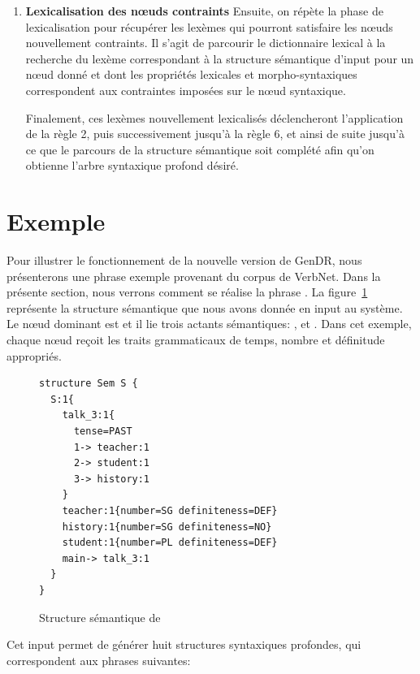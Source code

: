 \begin{enumerate}
	\item \textbf{Lexicalisation des n\oe{}uds contraints}
Ensuite, on répète la phase de lexicalisation pour récupérer les lexèmes qui pourront satisfaire les n\oe{}uds nouvellement contraints. Il s'agit de parcourir le dictionnaire lexical à la recherche du lexème correspondant à la structure sémantique d'input pour un n\oe{}ud donné et dont les propriétés lexicales et morpho-syntaxiques correspondent aux contraintes imposées sur le n\oe{}ud syntaxique.

Finalement, ces lexèmes nouvellement lexicalisés déclencheront l'application de la règle 2, puis successivement jusqu'à la règle 6, et ainsi de suite jusqu'à ce que le parcours de la structure sémantique soit complété afin qu'on obtienne l'arbre syntaxique profond désiré.

\end{enumerate} 

\section{Exemple}

Pour illustrer le fonctionnement de la nouvelle version de GenDR, nous présenterons une phrase exemple provenant du corpus de VerbNet. Dans la présente section, nous verrons comment se réalise la phrase . La figure~\ref{fig:history} représente la structure sémantique que nous avons donnée en input au système. Le n\oe{}ud dominant est  et il lie trois actants sémantiques: ,  et . Dans cet exemple, chaque n\oe{}ud reçoit les traits grammaticaux de temps, nombre et définitude appropriés.

\begin{figure}[htb]
  \caption{Structure sémantique de }
	\label{fig:history}
\begin{lstlisting}[language=mate]
structure Sem S {
  S:1{
    talk_3:1{
      tense=PAST 
      1-> teacher:1
      2-> student:1
	  3-> history:1
    }
    teacher:1{number=SG definiteness=DEF}
    history:1{number=SG definiteness=NO}
    student:1{number=PL definiteness=DEF}
    main-> talk_3:1
  }
}
\end{lstlisting}
\end{figure}

Cet input permet de générer huit structures syntaxiques profondes, qui correspondent aux phrases suivantes:


